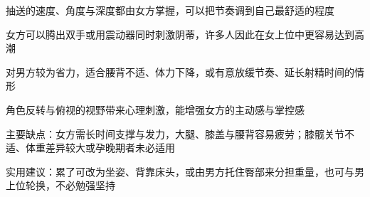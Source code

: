 	\item 抽送的速度、角度与深度都由女方掌握，可以把节奏调到自己最舒适的程度
	\item 女方可以腾出双手或用震动器同时刺激阴蒂，许多人因此在女上位中更容易达到高潮
	\item 对男方较为省力，适合腰背不适、体力下降，或有意放缓节奏、延长射精时间的情形
	\item 角色反转与俯视的视野带来心理刺激，能增强女方的主动感与掌控感
	\item 主要缺点：女方需长时间支撑与发力，大腿、膝盖与腰背容易疲劳；膝髋关节不适、体重差异较大或孕晚期者未必适用
	\item 实用建议：累了可改为坐姿、背靠床头，或由男方托住臀部来分担重量，也可与男上位轮换，不必勉强坚持
